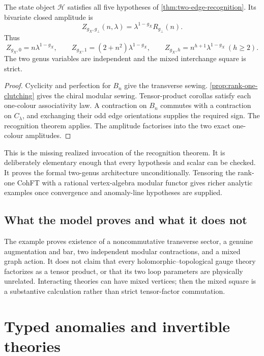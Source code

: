 \begin{theorem}\label{thm:realized-two-edge}
The state object \(\mathcal H\) satisfies all five hypotheses of \cref{thm:two-edge-recognition}.  Its bivariate closed amplitude is
\[
 \boxed{\quad
 Z_{g_X,g_\perp}(n,\lambda)
 =\lambda^{1-g_X}R_{g_\perp}(n).
 \quad}
\]
Thus
\[
 Z_{g_X,0}=n\lambda^{1-g_X},
 \qquad
 Z_{g_X,1}=(2+n^2)\lambda^{1-g_X},
 \qquad
 Z_{g_X,h}=n^{h+1}\lambda^{1-g_X}\ (h\ge2).
\]
The two genus variables are independent and the mixed interchange square is strict.
\end{theorem}
\begin{proof}
Cyclicity and perfection for \(B_n\) give the transverse sewing.  \cref{prop:rank-one-clutching} gives the chiral modular sewing.  Tensor-product corollas satisfy each one-colour associativity law.  A contraction on \(B_n\) commutes with a contraction on \(C_\lambda\), and exchanging their odd edge orientations supplies the required sign.  The recognition theorem applies.  The amplitude factorises into the two exact one-colour amplitudes.
\end{proof}

This is the missing realized invocation of the recognition theorem.  It is deliberately elementary enough that every hypothesis and scalar can be checked.  It proves the formal two-genus architecture unconditionally.  Tensoring the rank-one CohFT with a rational vertex-algebra modular functor gives richer analytic examples once convergence and anomaly-line hypotheses are supplied.

\section{What the model proves and what it does not}
The example proves existence of a noncommutative transverse sector, a genuine augmentation and bar, two independent modular contractions, and a mixed graph action.  It does not claim that every holomorphic--topological gauge theory factorizes as a tensor product, or that its two loop parameters are physically unrelated.  Interacting theories can have mixed vertices; then the mixed square is a substantive calculation rather than strict tensor-factor commutation.

\chapter{Typed anomalies and invertible theories}\label{chap:anomalies}

